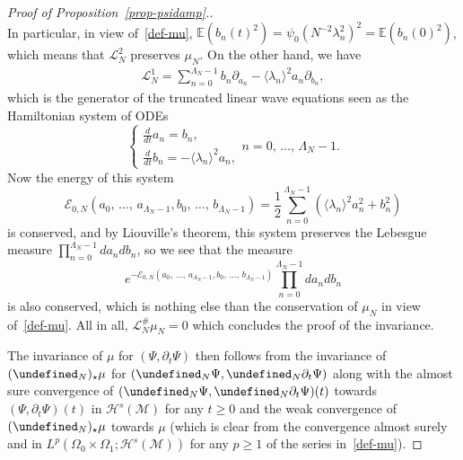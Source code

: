 \documentclass[AHL,Unicode,longabstracts,published]{cedram}
\newcommand{\E}{\mathbb{E}}
\let\P= \undefined
\newcommand{\P}{\mathbf{P}}
\newcommand{\En}{\mathcal{E}}
\renewcommand{\L}{\mathcal{L}}
\newcommand{\M}{\mathcal{M}}
\renewcommand{\H}{\mathcal{H}}
\newcommand{\Ld}{\Lambda}
\newcommand{\dt}{\partial_t}
\renewcommand{\O}{\Omega}
\newcommand{\jb}[1] {\langle #1 \rangle}
\begin{document}
\begin{proof}[Proof of Proposition~\ref{prop-psidamp}.]
\begin{equation*}
\end{equation*}
In particular, in view of~\eqref{def-mu}, $\E(b_n(t)^2)= \psi_0(N^{-2}\lambda_n^2)^2 = \E(b_n(0)^2) $, which means that $\L_N^2$ preserves $\mu_N$. On the other hand, we have
\begin{align*}
\L_N^1 = \sum_{n=0}^{\Ld_N-1}b_n\partial_{a_n}-\jb{\lambda_n}^2a_n\partial_{b_n},
\end{align*}
which is the generator of the truncated linear wave equations seen as the Hamiltonian system of ODEs
\begin{equation*}
\begin{cases}
\frac{d}{dt}a_n = b_n,\\
\frac{d}{dt}b_n = -\jb{\lambda_n}^2a_n,
\end{cases} n=0,\,\dots,\,\Ld_N-1.
\end{equation*}
Now the energy of this system
\begin{equation*}
\En_{0,N}\left(a_0,\,\dots,\,a_{\Ld_N-1},b_0,\,\dots,\,b_{\Ld_N-1}\right) = \frac12\sum_{n=0}^{\Ld_N-1}\left(\jb{\lambda_n}^2a_n^2+b_n^2\right)
\end{equation*}
is conserved, and by Liouville's theorem, this system preserves the Lebesgue measure $\prod_{n=0}^{\Ld_N-1}da_ndb_n$, so we see that the measure
\[
e^{-\En_{0,N}\left(a_0,\,\dots,\,a_{\Ld_N-1},b_0,\,\dots,\,b_{\Ld_N-1}\right)}\prod_{n=0}^{\Ld_N-1}da_ndb_n
\]
is also conserved, which is nothing else than the conservation of $\mu_N$ in view of~\eqref{def-mu}. All in all, $\L_N^\#\mu_N=0$ which concludes the proof of the invariance.

The invariance of $\mu$ for $(\Psi,\dt \Psi)$ then follows from the invariance of $(\P_N)_\star\mu$ for $(\P_N\Psi,\P_N\dt\Psi)$ along with the almost sure convergence of $(\P_N\Psi,\P_N\dt\Psi)(t)$ towards $(\Psi,\dt\Psi)(t)$ in $\H^s(\M)$ for any $t\ge 0$ and the weak convergence of $(\P_N)_\star\mu$ towards $\mu$ (which is clear from the convergence almost surely and in $L^p(\O_0\times\O_1;\H^s(\M))$ for any $p\ge 1$ of the series in~\eqref{def-mu}).


\end{proof}
\end{document}
